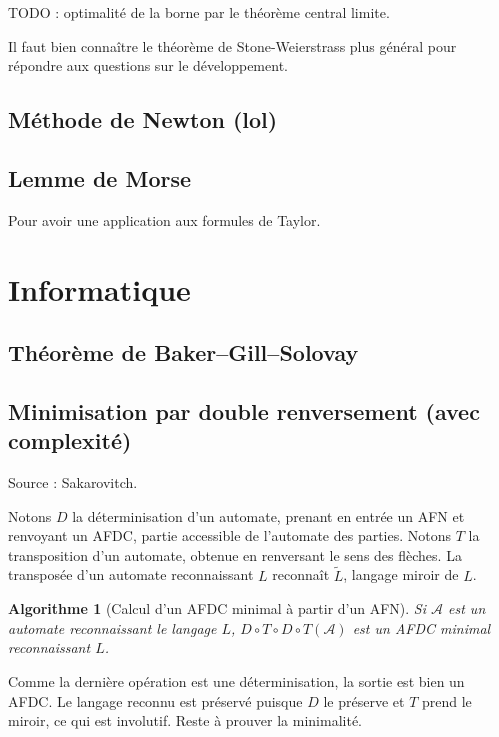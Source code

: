 \documentclass[a4paper, 11pt]{article}
\newtheorem*{algo}{Algorithme}
\begin{document}
TODO : optimalité de la borne par le théorème central limite.

Il faut bien connaître le théorème de Stone-Weierstrass plus général pour
répondre aux questions sur le développement.

\subsection{Méthode de Newton (lol)}

\subsection{Lemme de Morse}

Pour avoir une application aux formules de Taylor.

\section{Informatique}

\subsection{Théorème de Baker--Gill--Solovay}



\subsection{Minimisation par double renversement (avec complexité)}

Source : Sakarovitch.

Notons $D$ la déterminisation d'un automate, prenant en entrée un AFN et
renvoyant un AFDC, partie accessible de l'automate des parties. Notons $T$ la
transposition d'un automate, obtenue en renversant le sens des flèches. La
transposée d'un automate reconnaissant $L$ reconnaît $\tilde{L}$, langage miroir
de $L$.

\begin{algo}[Calcul d'un AFDC minimal à partir d'un AFN]
  Si $\mathcal{A}$ est un automate reconnaissant le langage $L$, $D \circ T
  \circ D \circ T(\mathcal{A})$ est un AFDC minimal reconnaissant $L$.
\end{algo}

Comme la dernière opération est une déterminisation, la sortie est bien un AFDC.
Le langage reconnu est préservé puisque $D$ le préserve et $T$ prend le miroir,
ce qui est involutif. Reste à prouver la minimalité.
\end{document}
